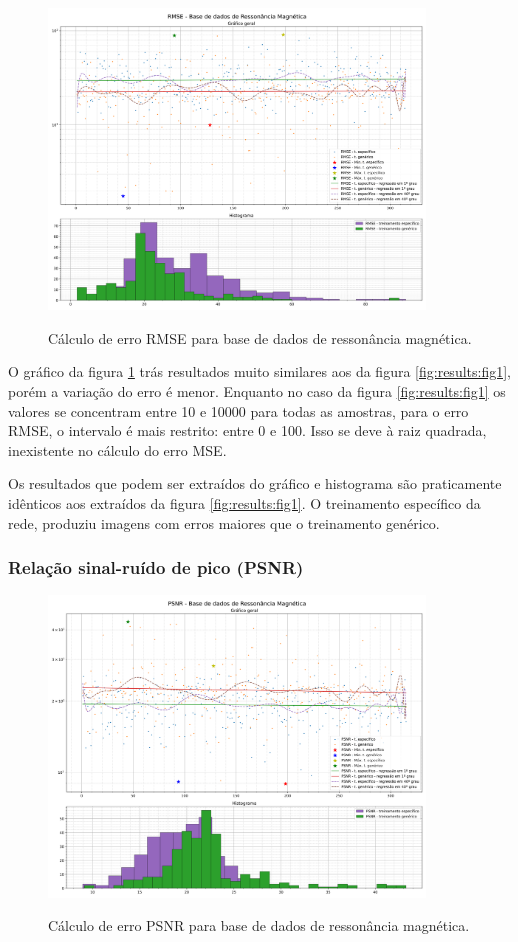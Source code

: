\begin{figure}[H]
    \centering
    \caption{Cálculo de erro RMSE para base de dados de ressonância magnética.}
    \includegraphics[width=10cm]{fig/resultados/mri/png/rmse_mri_compound.png}
    \label{fig:results:fig2}
\end{figure}

O gráfico da figura \ref{fig:results:fig2} trás resultados muito similares aos da figura \ref{fig:results:fig1}, porém a variação do erro é menor. Enquanto no caso da figura \ref{fig:results:fig1} os valores se concentram entre 10 e 10000 para todas as amostras, para o erro RMSE, o intervalo é mais restrito: entre 0 e 100. Isso se deve à raiz quadrada, inexistente no cálculo do erro MSE.

Os resultados que podem ser extraídos do gráfico e histograma são praticamente idênticos aos extraídos da figura \ref{fig:results:fig1}. O treinamento específico da rede, produziu imagens com erros maiores que o treinamento genérico. 

\subsubsection{Relação sinal-ruído de pico (PSNR)}
\label{sec:result:mri:psnr}

\begin{figure}[H]
    \centering
    \caption{Cálculo de erro PSNR para base de dados de ressonância magnética.}
    \includegraphics[width=10cm]{fig/resultados/mri/png/psnr_mri_compound.png}
    \label{fig:results:fig3}
\end{figure}

